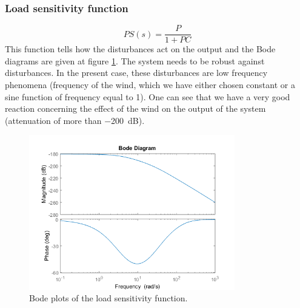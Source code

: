 \subsubsection{Load sensitivity function}
$$
PS(s) = \dfrac{P}{1 + PC}
$$
This function tells how the disturbances act on the output and the Bode diagrams are given at figure \ref{fig:load}. The system needs to be robust against disturbances. In the present case, these disturbances are low frequency phenomena (frequency of the wind, which we have either chosen constant or a sine function of frequency equal to 1). One can see that we have a very good reaction concerning the effect of the wind on the output of the system (attenuation of more than \SI{-200}{\deci\bel}).
\begin{figure}[H]
    \centering
    \includegraphics[width=0.8\textwidth]{resources/png/load.png}
    \caption{Bode plots of the load sensitivity function.}
    \label{fig:load}
\end{figure}

